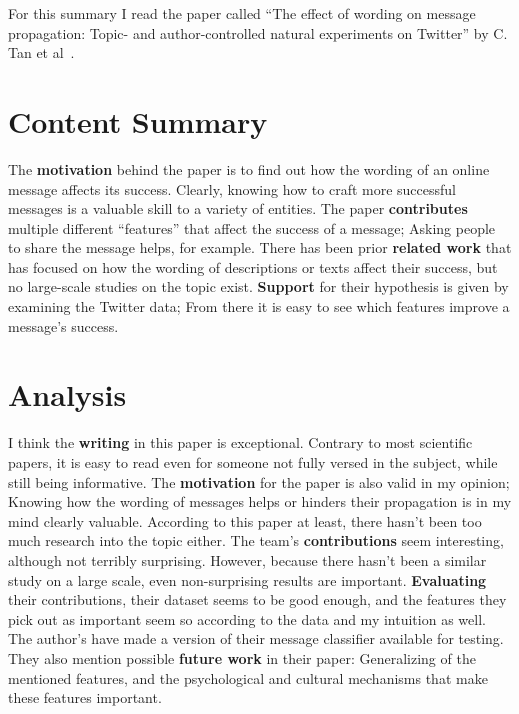 For this summary I read the paper called ``The effect of wording on message
propagation: Topic- and author-controlled natural experiments on Twitter'' by
C. Tan et al~\cite{DBLP:journals/corr/TanLP14}.

\section{Content Summary}

The \textbf{motivation} behind the paper is to find out how the wording of an
online message affects its success. Clearly, knowing how to craft more
successful messages is a valuable skill to a variety of entities.
The paper \textbf{contributes} multiple different ``features'' that affect the
success of a message; Asking people to share the message helps, for example.
There has been prior \textbf{related work} that has focused on how the wording
of descriptions or texts affect their success, but no large-scale studies on
the topic exist.
\textbf{Support} for their hypothesis is given by examining the Twitter data;
From there it is easy to see which features improve a message's success.


\section{Analysis}

I think the \textbf{writing} in this paper is exceptional. Contrary to most
scientific papers, it is easy to read even for someone not fully versed in the
subject, while still being informative.
The \textbf{motivation} for the paper is also valid in my opinion; Knowing how
the wording of messages helps or hinders their propagation is in my mind
clearly valuable. According to this paper at least, there hasn't been too much
research into the topic either.
The team's \textbf{contributions} seem interesting, although not terribly
surprising. However, because there hasn't been a similar study on a large
scale, even non-surprising results are important.
\textbf{Evaluating} their contributions, their dataset seems to be good enough,
and the features they pick out as important seem so according to the data and
my intuition as well.
The author's have made a version of their message classifier available for
testing. They also mention possible \textbf{future work} in their paper:
Generalizing of the mentioned features, and the psychological and cultural
mechanisms that make these features important.

